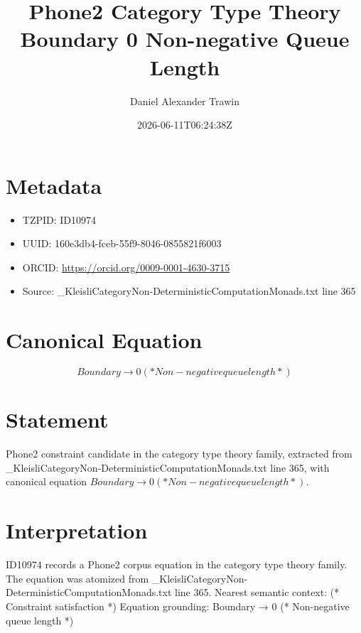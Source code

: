 \documentclass[11pt]{article}
\title{Phone2 Category Type Theory Boundary 0 Non-negative Queue Length}
\author{Daniel Alexander Trawin}
\date{2026-06-11T06:24:38Z}
\begin{document}
\maketitle
\section*{Metadata}
\begin{itemize}
\item TZPID: ID10974
\item UUID: 160e3db4-fceb-55f9-8046-0855821f6003
\item ORCID: \url{https://orcid.org/0009-0001-4630-3715}
\item Source: _KleisliCategoryNon-DeterministicComputationMonads.txt line 365
\end{itemize}
\section*{Canonical Equation}
\[
Boundary → 0 (* Non-negative queue length *)
\]
\section*{Statement}
Phone2 constraint candidate in the category type theory family, extracted from _KleisliCategoryNon-DeterministicComputationMonads.txt line 365, with canonical equation $Boundary → 0 (* Non-negative queue length *)$.
\section*{Interpretation}
ID10974 records a Phone2 corpus equation in the category type theory family. The equation was atomized from _KleisliCategoryNon-DeterministicComputationMonads.txt line 365. Nearest semantic context: (* Constraint satisfaction *) Equation grounding: Boundary → 0 (* Non-negative queue length *)
\end{document}
